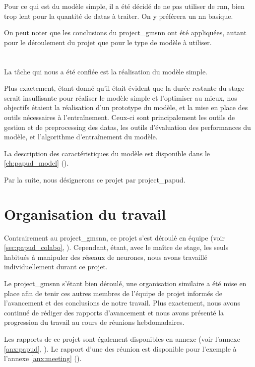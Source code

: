 Pour ce qui est du modèle simple, il a été décidé de ne pas utiliser de \gls{rnn}, bien trop lent pour la quantité de \glspl{data} à traiter. On y préférera un \gls{nn} basique.

On peut noter que les conclusions du \gls{project_gmsnn} ont été appliquées, autant pour le déroulement du projet que pour le type de modèle à utiliser.


\section{}
La tâche qui nous a été confiée est la réalisation du modèle simple.

Plus exactement, étant donné qu'il était évident que la durée restante du stage serait insuffisante pour réaliser le modèle simple et l'optimiser au mieux, nos objectifs étaient la réalisation d'un prototype du modèle, et la mise en place des outils nécessaires à l'entraînement.
Ceux-ci sont principalement les outils de gestion et de \gls{preprocessing} des \glspl{data}, les outils d'évaluation des performances du modèle, et l'algorithme d'entraînement du modèle.

La description des caractéristiques du modèle est disponible dans le \autoref{ch:papud_model} ().

Par la suite, nous désignerons ce projet par \og \gls{project_papud}\fg{}.

\section{Organisation du travail}
Contrairement au \gls{project_gmsnn}, ce projet s'est déroulé en équipe (voir \autoref{sec:papud_colabo}, ).
Cependant, étant, avec le maître de stage, les seuls habitués à manipuler des réseaux de neurones, nous avons travaillé individuellement durant ce projet.

Le \gls{project_gmsnn} s'étant bien déroulé, une organisation similaire a été mise en place afin de tenir ces autres membres de l'équipe de projet informés de l'avancement et des conclusions de notre travail.
Plus exactement, nous avons continué de rédiger des rapports d'avancement et nous avons présenté la progression du travail au cours de réunions hebdomadaires.

Les rapports de ce projet sont également disponibles en annexe (voir l'annexe \ref{anx:papud}, ).
Le rapport d'une des réunion est disponible pour l'exemple à l'annexe \ref{anx:meeting} (). %

